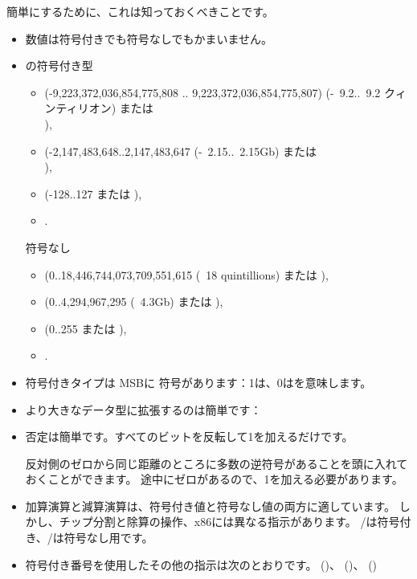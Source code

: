 簡単にするために、これは知っておくべきことです。

\begin{itemize}
\item 数値は符号付きでも符号なしでもかまいません。

\item \CCpp の符号付き型

  \begin{itemize}
    \item {} (-9,223,372,036,854,775,808 .. 9,223,372,036,854,775,807)
	  (-~9.2..~9.2 クィンティリオン) または \\
                ),
    \item \Tint (-2,147,483,648..2,147,483,647 (-~2.15..~2.15Gb) または \\
	    ),
    \item \Tchar (-128..127 または ),
    \item {}.
   \end{itemize}

	符号なし
  \begin{itemize}
	  \item {} (0..18,446,744,073,709,551,615 
		  (~18 quintillions) または ),
   \item {} (0..4,294,967,295 (~4.3Gb) または ),
   \item {} (0..255 または ), 
   \item {}.
  \end{itemize}

\item 符号付きタイプは \ac{MSB}に 符号があります：1は、0はを意味します。

\item より大きなデータ型に拡張するのは簡単です：

\label{sec:signednumbers:negation}
\item 否定は簡単です。すべてのビットを反転して1を加えるだけです。

反対側のゼロから同じ距離のところに多数の逆符号があることを頭に入れておくことができます。
途中にゼロがあるので、1を加える必要があります。

\item 
	加算演算と減算演算は、符号付き値と符号なし値の両方に適しています。
	しかし、チップ分割と除算の操作、x86には異なる指示があります。
	/は符号付き、/は符号なし用です。
\item
	符号付き番号を使用したその他の指示は次のとおりです。
	 ()、  ()、  ()
\end{itemize}

